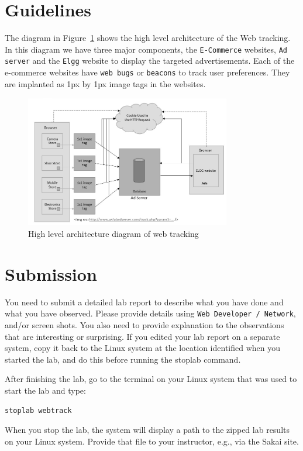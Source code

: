 \section{Guidelines}

The diagram in Figure~\ref{fig:guideline_figure} shows the high level architecture of the Web tracking. 
In this diagram we have three major components, the {\tt E-Commerce} websites, {\tt Ad server} and the {\tt Elgg} website to display the targeted advertisements. 
Each of the e-commerce websites have {\tt web bugs} or {\tt beacons} to track user preferences. 
They are implanted as 1px by 1px image tags in the websites.

	\begin{figure}
	\centering
	\includegraphics[width=0.8\textwidth]{Figs/Guidelinefigure.jpg}
	\caption{High level architecture diagram of web tracking} 
	\label{fig:guideline_figure}
	\end{figure}


\section{Submission}

You need to submit a detailed lab report to describe what you have
done and what you have observed. Please provide details using 
{\tt Web Developer / Network}, and/or screen shots. 
You also need to provide explanation
to the observations that are interesting or surprising.
If you edited your lab report on a separate system, copy it back to the Linux system at the location
identified when you started the lab, and do this before running the stoplab command.

After finishing the lab, go to the terminal on your Linux system that was used to start the lab and type:
\begin{verbatim}
stoplab webtrack
\end{verbatim}
When you stop the lab, the system will display a path to the zipped lab results on your Linux system.  Provide that file to
your instructor, e.g., via the Sakai site.



